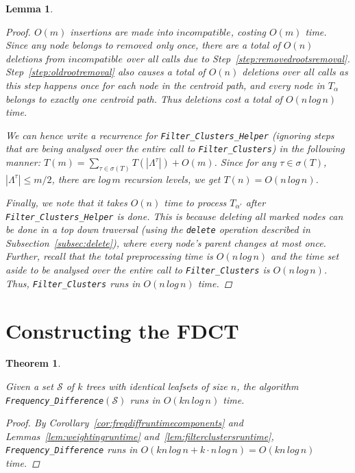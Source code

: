 \documentclass{article}
\newcommand{\leafset}{\Lambda}
\newcommand{\TA}{T_\alpha}
\newtheorem{filterclustersruntime}[incompatibility]{Lemma}
\newtheorem{freqdiffruntime}[incompatibility]{Theorem}
\begin{document}
\begin{filterclustersruntime}
\begin{proof}
            $O(m)$ insertions are made into $incompatible$, costing $O(m)$ time. Since any node belongs to $removed$ only once, there are a total of $O(n)$ deletions from $incompatible$ over all calls due to Step~\ref{step:removedrootsremoval}. Step~\ref{step:oldrootremoval} also causes a total of $O(n)$ deletions over all calls as this step happens once for each node in the centroid path, and every node in $\TA$ belongs to exactly one centroid path. Thus deletions cost a total of $O(n\,log\,n)$ time.

            We can hence write a recurrence for \texttt{Filter\_Clusters\_Helper} (ignoring steps that are being analysed over the entire call to \texttt{Filter\_Clusters}) in the following manner: $T(m) = \sum_{\tau \in \sigma(T)}T(|\leafset^{\tau}|) + O(m)$. Since for any $\tau \in \sigma(T)$, $|\leafset^{\tau}| \leq m/2$, there are $log\,m$ recursion levels, we get $T(n) = O(n\,log\,n)$.

            Finally, we note that it takes $O(n)$ time to process $T_{\alpha'}$ after \texttt{Filter\_Clusters\_Helper} is done. This is because deleting all marked nodes can be done in a top down traversal (using the \texttt{delete} operation described in Subsection~\ref{subsec:delete}), where every node's parent changes at most once. Further, recall that the total preprocessing time is $O(n\,log\,n)$ and the time set aside to be analysed over the entire call to \texttt{Filter\_Clusters} is $O(n\,log\,n)$. Thus, \texttt{Filter\_Clusters} runs in $O(n\,log\,n)$ time.
        \end{proof}
    \end{filterclustersruntime}

    \section{Constructing the FDCT}
    \label{sec:freqdiffconstruction}

    \begin{freqdiffruntime}
        \label{theorem:freqdiffruntime}

        Given a set $\mathcal{S}$ of $k$ trees with identical leafsets of size $n$, the algorithm \texttt{Frequency\_Difference}$(\mathcal{S})$ runs in $O(kn\,log\,n)$ time.

        \begin{proof}
            By Corollary~\ref{cor:freqdiffruntimecomponents} and Lemmas~\ref{lem:weightingruntime} and~\ref{lem:filterclustersruntime}, \texttt{Frequency\_Difference} runs in $O(kn\,log\,n + k \cdot n\,log\,n) = O(kn\,log\,n)$ time.
        \end{proof}
    \end{freqdiffruntime}

    \newpage
    
    
\end{document}
